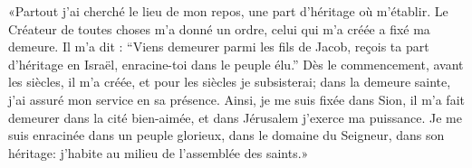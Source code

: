 «Partout j’ai cherché le lieu de mon repos,
    une part d’héritage où m’établir.
Le Créateur de toutes choses m’a donné un ordre,
    celui qui m’a créée a fixé ma demeure.
Il m’a dit : “Viens demeurer parmi les fils de Jacob,
    reçois ta part d’héritage en Israël, enracine-toi dans le peuple élu.”
Dès le commencement, avant les siècles, il m’a créée,
	et pour les siècles je subsisterai;
	dans la demeure sainte, j’ai assuré mon service en sa présence.
Ainsi, je me suis fixée dans Sion,
	il m’a fait demeurer dans la cité bien-aimée,
	et dans Jérusalem j’exerce ma puissance.
Je me suis enracinée dans un peuple glorieux,
	dans le domaine du Seigneur, dans son héritage:
	j’habite au milieu de l’assemblée des saints.»
